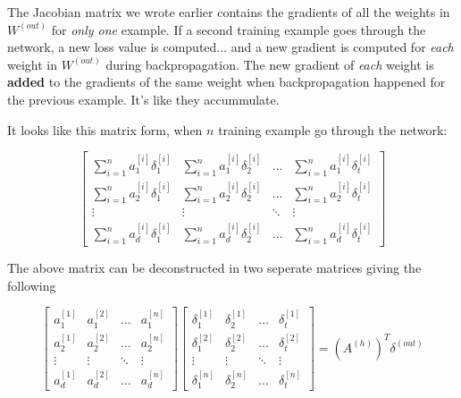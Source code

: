 \documentclass[../main.tex]{subfiles}
\begin{document}
The Jacobian matrix we wrote earlier contains the gradients of all the
weights in $W^{(out)}$ for \emph{only one} example. If a second training example goes 
through the network, a new loss value is computed...  and a new gradient is computed
for \emph{each} weight in $W^{(out)}$ during backpropagation. The new gradient of \emph{each} weight
is \textbf{added} to the gradients of the same weight when backpropagation happened for the previous example.
It's like they accummulate.

\vspace{5mm} %

It looks like this matrix form, when $n$ training example go through the network:

\[
    \begin{bmatrix}
        \sum_{i=1}^{n} a_1^{[i]}\delta_1^{[i]}  & \sum_{i=1}^{n} a_1^{[i]}\delta_2^{[i]} & \dots    & \sum_{i=1}^{n} a_1^{[i]}\delta_t^{[i]} \\
        \sum_{i=1}^{n} a_2^{[i]}\delta_1^{[i]}  & \sum_{i=1}^{n} a_2^{[i]}\delta_2^{[i]} & \dots    & \sum_{i=1}^{n} a_2^{[i]}\delta_t^{[i]} \\
        \vdots                                  & \vdots                                 & \ddots   & \vdots                                 \\
        \sum_{i=1}^{n} a_d^{[i]}\delta_1^{[i]}  & \sum_{i=1}^{n} a_d^{[i]}\delta_2^{[i]} & \dots    & \sum_{i=1}^{n} a_d^{[i]}\delta_t^{[i]}
    \end{bmatrix}
\]

\vspace{5mm} %

The above matrix can be deconstructed in two seperate matrices giving the following

\vspace{5mm} %

\[
    \begin{bmatrix}
        a_1^{[1]}   & a_1^{[2]} & \dots  & a_1^{[n]} \\
        a_2^{[1]}   & a_2^{[2]} & \dots  & a_2^{[n]} \\
        \vdots      & \vdots    & \ddots & \vdots    \\
        a_d^{[1]}   & a_d^{[2]} & \dots  & a_d^{[n]}
    \end{bmatrix}
    \begin{bmatrix}
        \delta_1^{[1]}   & \delta_2^{[1]} & \dots  & \delta_t^{[1]} \\
        \delta_1^{[2]}   & \delta_2^{[2]} & \dots  & \delta_t^{[2]} \\
        \vdots      & \vdots    & \ddots & \vdots    \\
        \delta_1^{[n]}   & \delta_2^{[n]} & \dots  & \delta_t^{[n]} 
    \end{bmatrix}
    =
    (A^{(h)})^T \delta^{(out)}
\]
\end{document}
